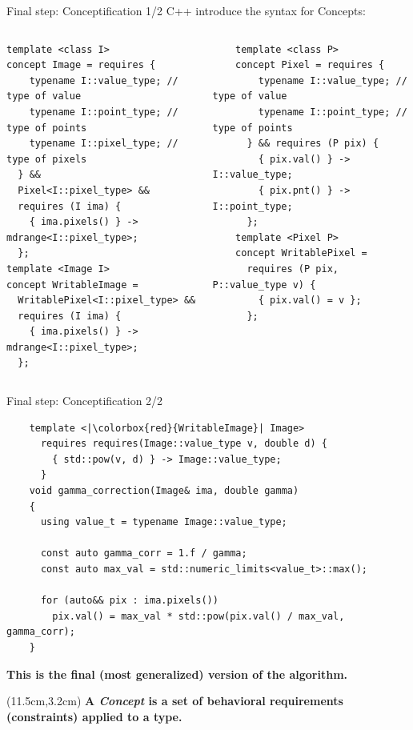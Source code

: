 \documentclass[12pt,aspectratio=169]{beamer}
\begin{document}
\begin{frame}[fragile]{Final step: Conceptification 1/2}
  C++ introduce the syntax for Concepts:
  \begin{columns}[T,onlytextwidth]
    \begin{verbatim}
template <class I>
concept Image = requires {
    typename I::value_type; // type of value
    typename I::point_type; // type of points
    typename I::pixel_type; // type of pixels
  } &&
  Pixel<I::pixel_type> &&
  requires (I ima) {
    { ima.pixels() } -> mdrange<I::pixel_type>;
  };
template <Image I>
concept WritableImage = 
  WritablePixel<I::pixel_type> &&
  requires (I ima) {
    { ima.pixels() } -> mdrange<I::pixel_type>;
  };
  \end{verbatim}

    \begin{verbatim}
    template <class P>
    concept Pixel = requires {
        typename I::value_type; // type of value
        typename I::point_type; // type of points
      } && requires (P pix) {
        { pix.val() } -> I::value_type;
        { pix.pnt() } -> I::point_type;
      };
    template <Pixel P>
    concept WritablePixel = 
      requires (P pix, P::value_type v) {
        { pix.val() = v };
      };
  \end{verbatim}
  \end{columns}
\end{frame}

\begin{frame}[fragile]{Final step: Conceptification 2/2}
  \begin{verbatim}
    template <|\colorbox{red}{WritableImage}| Image>
      requires requires(Image::value_type v, double d) {
        { std::pow(v, d) } -> Image::value_type;
      }
    void gamma_correction(Image& ima, double gamma)
    {
      using value_t = typename Image::value_type;
    
      const auto gamma_corr = 1.f / gamma;
      const auto max_val = std::numeric_limits<value_t>::max();
    
      for (auto&& pix : ima.pixels())
        pix.val() = max_val * std::pow(pix.val() / max_val, gamma_corr);
    }
  \end{verbatim}
  \vfill
  \begin{center}\textbf{This is the final (most generalized) version of the algorithm.}\end{center}
  \begin{textblock*}{4cm}(11.5cm,3.2cm)
    \textbf{A \emph{Concept} is a set of behavioral requirements (constraints) applied to a type.}
  \end{textblock*}
\end{frame}
\end{document}
